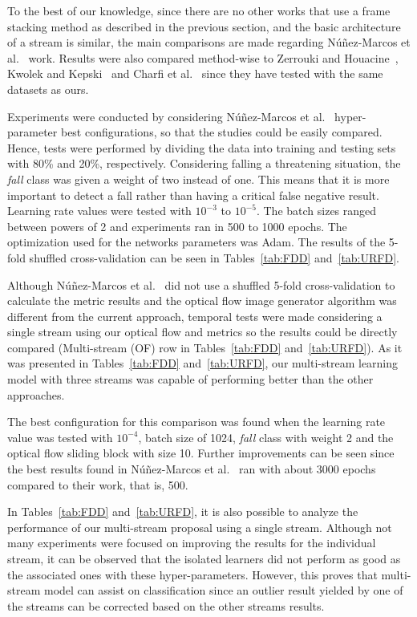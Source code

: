 \documentclass{article}
\begin{document}
To the best of our knowledge, since there are no other works that use a frame stacking method as described in the previous section, and the basic architecture of a stream is similar, the main comparisons are made regarding N\'u\~nez-Marcos et al.~\cite{nunez2017vision} work. Results were also compared method-wise to Zerrouki and Houacine~\cite{zerrouki2018combined}, Kwolek and Kepski~\cite{kwolek2015improving} and Charfi et al.~\cite{charfi2012definition} since they have tested with the same datasets as ours.

Experiments were conducted by considering N\'u\~nez-Marcos et al.~\cite{nunez2017vision} hyper-parameter best configurations, so that the studies could be easily compared. Hence, tests were performed by dividing the data into training and testing sets with 80\% and 20\%, respectively. Considering falling a threatening situation, the \textit{fall} class was given a weight of two instead of one. This means that it is more important to detect a fall rather than having a critical false negative result. Learning rate values were tested with $10^{−3}$ to $10^{−5}$. The batch sizes ranged between powers of 2 and experiments ran in 500 to 1000 epochs. The optimization used for the networks parameters was Adam. The results of the 5-fold shuffled cross-validation can be seen in Tables~\ref{tab:FDD} and~\ref{tab:URFD}.

Although N\'u\~nez-Marcos et al.~\cite{nunez2017vision} did not use a shuffled 5-fold cross-validation to calculate the metric results and the optical flow image generator algorithm was different from the current approach, temporal tests were made considering a single stream using our optical flow and metrics so the results could be directly compared (Multi-stream (OF) row in Tables~\ref{tab:FDD} and~\ref{tab:URFD}). As it was presented in Tables~\ref{tab:FDD} and~\ref{tab:URFD}, our multi-stream learning model with three streams was capable of performing better than the other approaches.

The best configuration for this comparison was found when the learning rate value was tested with $10^{−4}$, batch size of 1024, \textit{fall} class with weight 2 and the optical flow sliding block with size 10. Further improvements can be seen since the best results found in N\'u\~nez-Marcos et al.~\cite{nunez2017vision} ran with about 3000 epochs compared to their work, that is, 500.

In Tables~\ref{tab:FDD} and~\ref{tab:URFD}, it is also possible to analyze the performance of our multi-stream proposal using a single stream. Although not many experiments were focused on improving the results for the individual stream, it can be observed that the isolated learners did not perform as good as the associated ones with these hyper-parameters. However, this proves that multi-stream model can assist on classification since an outlier result yielded by one of the streams can be corrected based on the other streams results.
\end{document}
